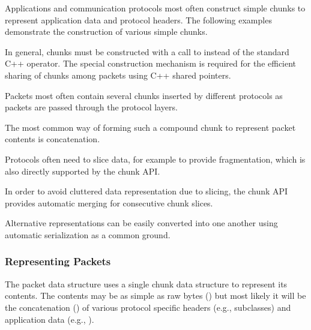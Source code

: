 Applications and communication protocols most often construct simple chunks
to represent application data and protocol headers. The following examples
demonstrate the construction of various simple chunks.


In general, chunks must be constructed with a call to 
instead of the standard  C++ operator. The special
construction mechanism is required for the efficient sharing of chunks
among packets using C++ shared pointers.

Packets most often contain several chunks inserted by different protocols
as packets are passed through the protocol layers.

The most common way of forming such a compound chunk to represent packet
contents is concatenation.


Protocols often need to slice data, for example to provide fragmentation,
which is also directly supported by the chunk API.


In order to avoid cluttered data representation due to slicing, the chunk
API provides automatic merging for consecutive chunk slices.


Alternative representations can be easily converted into one another using
automatic serialization as a common ground.



\subsubsection*{Representing Packets}

The packet data structure uses a single chunk data structure to represent
its contents. The contents may be as simple as raw bytes
() but most likely it will be the concatenation
() of various protocol specific headers (e.g.,
 subclasses) and application data (e.g.,
).


